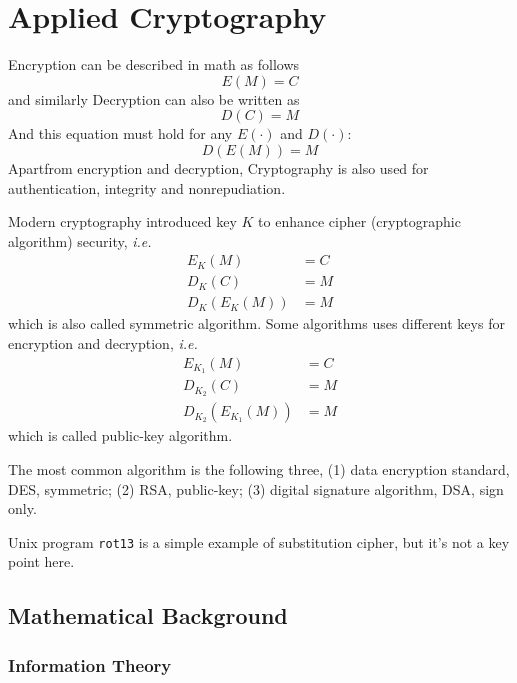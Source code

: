 \section{Applied Cryptography}

Encryption can be described in math as follows
$$ E(M) = C $$
and similarly Decryption can also be written as
$$ D(C) = M $$
And this equation must hold for any $E(\cdot)$ and $D(\cdot)$:
$$ D(E(M)) = M $$
Apartfrom encryption and decryption, Cryptography is also used for
authentication, integrity and nonrepudiation.

Modern cryptography introduced key $K$ to enhance cipher (cryptographic algorithm) security,
{\it i.e.}
\begin{align*}
E_K(M) &= C \\
D_K(C) &= M \\
D_K(E_K(M)) &= M
\end{align*}
which is also called symmetric algorithm.
Some algorithms uses different keys for encryption and decryption,
{\it i.e.}
\begin{align*}
E_{K_1}(M) &= C \\
D_{K_2}(C) &= M \\
D_{K_2}(E_{K_1}(M)) &= M
\end{align*}
which is called public-key algorithm.

The most common algorithm is the following three,
(1) data encryption standard, DES, symmetric; (2) RSA, public-key; (3) digital signature algorithm, DSA, sign only.

Unix program \verb|rot13| is a simple example of substitution cipher, but it's not a key point here.


\subsection{Mathematical Background}

\subsubsection{Information Theory}

